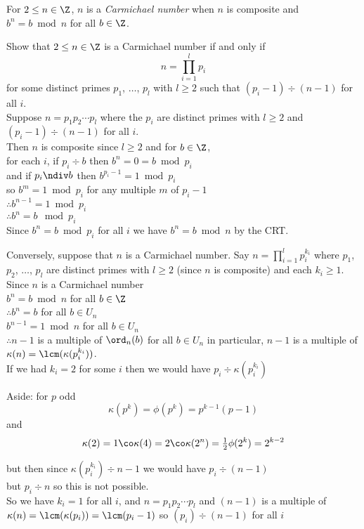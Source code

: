For $2\leq n\in\Z$, $n$ is a \emph{Carmichael number} when $n$ is composite and $b^n=b\bmod n$ for all $b\in\Z$.

\eg Show that $2\leq n\in\Z$ is a Carmichael number if and only if
\[ n = \prod_{i=1}^l p_i \]
for some distinct primes $p_1$, $\dotsc$, $p_l$ with $l\geq2$ such that $(p_i-1)\div(n-1)$ for all $i$. \\
\soln Suppose $n=p_1p_2\dotsm p_l$ where the $p_i$ are distinct primes with $l\geq2$ and $(p_i-1)\div(n-1)$ for all $i$. \\
Then $n$ is composite since $l\geq2$ and for $b\in\Z$, \\
for each $i$, if $p_i\div b$ then $b^n=0=b\bmod p_i$ \\
and if $p_i\ndiv b$ then $b^{p_i-1}=1\bmod p_i$ \\
so $b^m=1\bmod p_i$ for any multiple $m$ of $p_i-1$ \\
$\therefore b^{n-1}=1\bmod p_i$ \\
$\therefore b^n=b\mod p_i$ \\
Since $b^n=b\bmod p_i$ for all $i$ we have $b^n=b\bmod n$ by the CRT.

Conversely, suppose that $n$ is a Carmichael number.  Say $n=\prod_{i=1}^l p_i^{k_i}$ where $p_1$, $p_2$, $\dotsc$, $p_l$ are distinct primes with $l\geq2$ (since $n$ is composite) and each $k_i\geq1$. \\
Since $n$ is a Carmichael number \\
$b^n=b\bmod n$ for all $b\in\Z$ \\
$\therefore b^n=b$ for all $b\in U_n$ \\
$b^{n-1}=1\bmod n$ for all $b\in U_n$ \\
$\therefore n-1$ is a multiple of $\ord_n(b)$ for all $b\in U_n$ in particular, $n-1$ is a multiple of $\kappa(n)=\lcm(\kappa(p_i^{k_i}))$. \\
If we had $k_i=2$ for some $i$ then we would have $p_i\div\kappa(p_i^{k_i})$

Aside: for $p$ odd
\[ \kappa(p^k) = \phi(p^k) = p^{k-1}(p-1) \]
and
\[ \kappa(2) = 1\co\kappa(4)=2\co\kappa(2^n)=\tfrac12\phi(2^k)=2^{k-2} \]

but then since $\kappa(p_i^{k_i})\div n-1$ we would have $p_i\div(n-1)$ \\
but $p_i\div n$ so this is not possible. \\
So we have $k_i=1$ for all $i$, and $n=p_1p_2\dotsm p_l$ and $(n-1)$ is a multiple of $\kappa(n)=\lcm(\kappa(p_i))=\lcm(p_i-1)$ so $(p_i)\div(n-1)$ for all $i$

